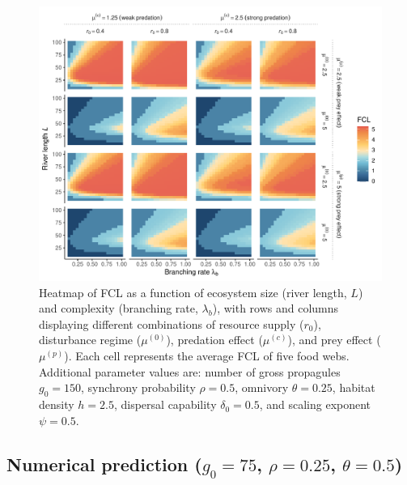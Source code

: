\begin{figure}
\centering
\includegraphics{../data_fmt/fig_rho05_g150_theta025.pdf}
\caption{Heatmap of FCL as a function of ecosystem size (river length,
\(L\)) and complexity (branching rate, \(\lambda_b\)), with rows and
columns displaying different combinations of resource supply (\(r_0\)),
disturbance regime (\(\mu^{(0)}\)), predation effect (\(\mu^{(c)}\)),
and prey effect (\(\mu^{(p)}\)). Each cell represents the average FCL of
five food webs. Additional parameter values are: number of gross
propagules \(g_0=150\), synchrony probability \(\rho=0.5\), omnivory
\(\theta=0.25\), habitat density \(h=2.5\), dispersal capability
\(\delta_0=0.5\), and scaling exponent \(\psi=0.5\).}
\end{figure}

\newpage

\subsection{\texorpdfstring{Numerical prediction (\(g_0=75\),
\(\rho=0.25\),
\(\theta=0.5\))}{Numerical prediction (g\_0=75, \textbackslash rho=0.25, \textbackslash theta=0.5)}}\label{numerical-prediction-g_075-rho0.25-theta0.5}

